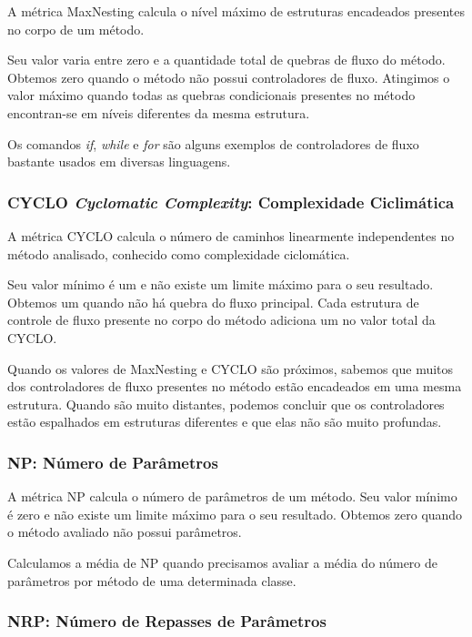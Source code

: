 A métrica MaxNesting \citep{Lanza06} calcula o nível máximo de estruturas encadeados presentes no corpo de um método.

Seu valor varia entre zero e a quantidade total de quebras de fluxo do método. Obtemos zero quando o método não possui controladores de fluxo. Atingimos o valor máximo quando todas as quebras condicionais presentes no método encontran-se em níveis diferentes da mesma estrutura.

Os comandos \textit{if}, \textit{while} e \textit{for} são alguns exemplos de controladores de fluxo bastante usados em diversas linguagens.
                         

\subsubsection{CYCLO \textit{Cyclomatic Complexity}: Complexidade Ciclimática}

A métrica CYCLO \citep{McCabe76} calcula o número de caminhos linearmente independentes no método analisado, conhecido como complexidade ciclomática.

Seu valor mínimo é um e não existe um limite máximo para o seu resultado. Obtemos um quando não há quebra do fluxo principal. Cada estrutura de controle de fluxo presente no corpo do método adiciona um no valor total da CYCLO.
	                          
Quando os valores de MaxNesting e CYCLO são próximos, sabemos que muitos dos controladores de fluxo presentes no método estão encadeados em uma mesma estrutura. Quando são muito distantes, podemos concluir que os controladores estão espalhados em estruturas diferentes e que elas não são muito profundas.
                                   

\subsubsection{NP: Número de Parâmetros}

A métrica NP calcula o número de parâmetros de um método. Seu valor mínimo é zero e não existe um limite máximo para o seu resultado. Obtemos zero quando o método avaliado não possui parâmetros.
                                                             
Calculamos a média de NP quando precisamos avaliar a média do número de parâmetros por método de uma determinada classe.	   
                                   

\subsubsection{NRP: Número de Repasses de Parâmetros}

